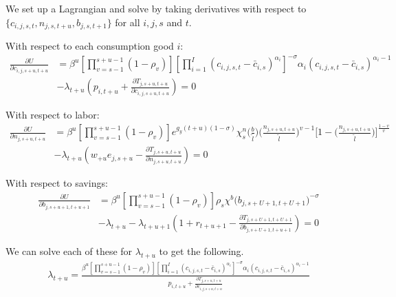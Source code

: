 \documentclass[letterpaper,12pt]{article}
\theoremstyle{definition}
\begin{document}
\begin{spacing}{1.5}
    We set up a Lagrangian and solve by taking derivatives with respect to $\{c_{i,j,s,t},n_{j,s,t+u},b_{j,s,t+1}\}$ for all $i,j,s$ and $t$.

    With respect to each consumption good $i$:
    \begin{equation}\label{Eqcfoc}
      \begin{split}
      \frac{\partial U}{\partial c_{i,j,s+u,t+u}} & = \beta^u\left[\prod_{v=s-1}^{s+u-1}(1-\rho_v)\right] \left[ \prod_{i=1}^I \left( c_{i,j,s,t} - \bar c_{i,s} \right) ^{\alpha_i} \right]^{-\sigma}\alpha_i \left( c_{i,j,s,t} - \bar c_{i,s} \right)^{\alpha_i-1} \\
       & - \lambda_{t+u} \left( p_{i,t+u} + \frac{\partial T_{j,s+u,t+u}}{\partial c_{i,j,s+u,t+u}} \right)= 0
        \end{split}
    \end{equation}

    With respect to labor:
    \begin{equation}\label{Eqnfoc}
      \begin{split}
      \frac{\partial U}{\partial n_{j,s+u,t+u}} & = \beta^u\left[\prod_{v=s-1}^{s+u-1}(1-\rho_v)\right] e^{g_y (t+u)(1-\sigma)}\chi^n_{s}\biggl(\frac{b}{\tilde{l}}\biggr)\biggl(\frac{n_{j,s+u,t+u}}{\tilde{l}}\biggr)^{v-1}\Biggl[1 - \biggl(\frac{n_{j,s+u,t+u}}{\tilde{l}}\biggr)\Biggr]^{\frac{1-v}{v}} \\
      & - \lambda_{t+u} \left( w_{+u} e_{j,s+u} - \frac{\partial T_{j,s+u,t+u}}{\partial n_{j,s+u,t+u}} \right)= 0
        \end{split}
    \end{equation}

    With respect to savings:
    \begin{equation}\label{Eqbfoc}
      \begin{split}
      \frac{\partial U}{\partial b_{j,s+u+1,t+u+1}} & = \beta^u\left[\prod_{v=s-1}^{s+u-1}(1-\rho_v)\right] \rho_s\chi^b\bigl(b_{j,s+U+1,t+U+1}\bigr)^{-\sigma} \\
      & - \lambda_{t+u} - \lambda_{t+u+1} \left( 1 + r_{t+u+1} - \frac{\partial T_{j,s+U+1,t+U+1}}{\partial b_{j,s+U+1,t+u+1}} \right)= 0
      \end{split}
    \end{equation}

    We can solve each of these for $\lambda_{t+u}$ to get the following.
    \begin{equation}
      \begin{split}
      \lambda_{t+u} = \frac{ \beta^u\left[\prod_{v=s-1}^{s+u-1}(1-\rho_v)\right] \left[ \prod_{i=1}^I \left( c_{i,j,s,t} - \bar c_{i,s} \right) ^{\alpha_i} \right]^{-\sigma}\alpha_i \left( c_{i,j,s,t} - \bar c_{i,s} \right)^{\alpha_i-1} } { p_{i,t+u} + \frac{\partial T_{j,s+u,t+u}}{\partial c_{i,j,s+u,t+u}} } \nonumber
      \end{split}
    \end{equation}


\end{spacing}
\end{document}
